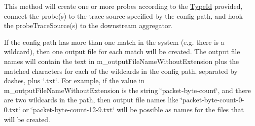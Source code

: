 This method will create one or more probes according to the \hyperlink{classns3_1_1TypeId}{Type\+Id} provided, connect the probe(s) to the trace source specified by the config path, and hook the probe\+Trace\+Source(s) to the downstream aggregator.

If the config path has more than one match in the system (e.\+g. there is a wildcard), then one output file for each match will be created. The output file names will contain the text in m\+\_\+output\+File\+Name\+Without\+Extension plus the matched characters for each of the wildcards in the config path, separated by dashes, plus \char`\"{}.\+txt\char`\"{}. For example, if the value in m\+\_\+output\+File\+Name\+Without\+Extension is the string \char`\"{}packet-\/byte-\/count\char`\"{}, and there are two wildcards in the path, then output file names like \char`\"{}packet-\/byte-\/count-\/0-\/0.\+txt\char`\"{} or \char`\"{}packet-\/byte-\/count-\/12-\/9.\+txt\char`\"{} will be possible as names for the files that will be created.

